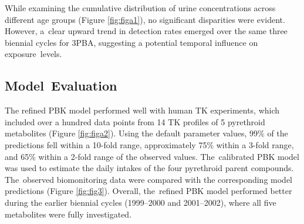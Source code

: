 \documentclass[toxics,article,accept,pdftex,moreauthors]{Definitions/mdpi}
\begin{document}
While examining the cumulative distribution of urine concentrations
across different age groups (Figure \ref{fig:figa1}), no significant
disparities were evident. However, a~clear upward trend in detection
rates emerged over the same three biennial cycles for 3PBA, suggesting a
potential temporal influence on exposure~levels.

\subsection{Model~Evaluation}\label{model-evaluation}

The refined PBK model performed well with human TK experiments, which
included over a hundred data points from 14 TK profiles of 5 pyrethroid
metabolites (Figure \ref{fig:figa2}). Using the default parameter values, 99\% of the predictions
fell within a 10-fold range, approximately 75\% within a 3-fold range,
and 65\% within a 2-fold range of the observed values. The~calibrated
PBK model was used to estimate the daily intakes of the four pyrethroid
parent compounds. The~observed biomonitoring data were compared with the
corresponding model predictions (Figure \ref{fig:fig3}). Overall, the~refined PBK model performed better during the earlier biennial cycles
(1999--2000 and 2001--2002), where all five metabolites were fully
investigated.
\end{document}
